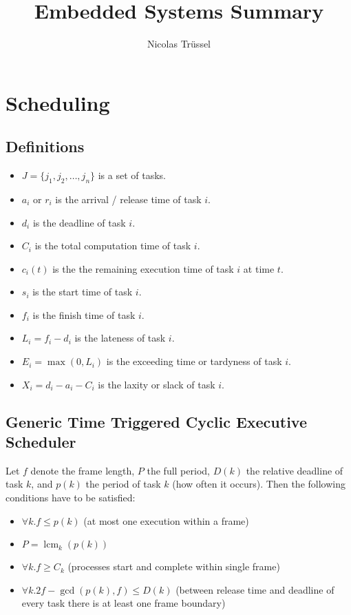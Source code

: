 \documentclass[a4paper,titlepage]{article}
\author{Nicolas Trüssel}
\title{Embedded Systems Summary}
\newcommand{\set}[1]{\lbrace #1 \rbrace}
\DeclareMathOperator{\lcm}{lcm}
\begin{document}
\maketitle

\section{Scheduling}

\subsection{Definitions}
\begin{itemize}
	\item $J = \set{j_1, j_2, \dots, j_n}$ is a set of tasks.
	\item $a_i$ or $r_i$ is the arrival / release time of task $i$.
	\item $d_i$ is the deadline of task $i$.
	\item $C_i$ is the total computation time of task $i$.
	\item $c_i(t)$ is the the remaining execution time of task $i$ at time $t$.
	\item $s_i$ is the start time of task $i$.
	\item $f_i$ is the finish time of task $i$.
	\item $L_i = f_i - d_i$ is the lateness of task $i$.
	\item $E_i = \max\left(0, L_i\right)$ is the exceeding time or tardyness of task $i$.
	\item $X_i = d_i - a_i - C_i$ is the laxity or slack of task $i$.
\end{itemize}

\subsection{Generic Time Triggered Cyclic Executive Scheduler}
Let $f$ denote the frame length, $P$ the full period, $D(k)$ the relative deadline of task $k$,
and $p(k)$ the period of task $k$ (how often it occurs). Then the following
conditions have to be satisfied:
\begin{itemize}
	\item $\forall k . f \leq p(k)$ (at most one execution within a frame)
	\item $P = \lcm_k\left(p(k)\right)$
	\item $\forall k . f \geq C_k$ (processes start and complete within single frame)
	\item $\forall k . 2f - \gcd\left(p(k),f\right) \leq D(k)$ (between release time and deadline of every task there is at least one frame boundary)
\end{itemize}
\end{document}
